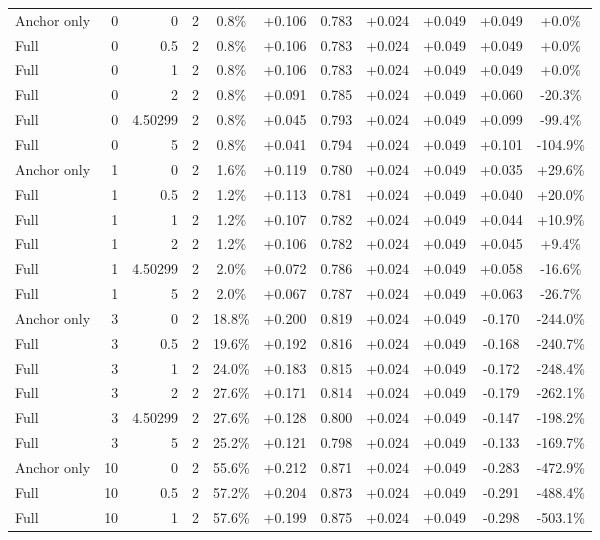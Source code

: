 \begin{table}[htbp]
\begin{tabular}{lrrrccccccc}
Anchor only & 0 & 0 & 2 & 0.8\% & +0.106 & 0.783 & +0.024 & +0.049 & +0.049 & +0.0\% \\
Full & 0 & 0.5 & 2 & 0.8\% & +0.106 & 0.783 & +0.024 & +0.049 & +0.049 & +0.0\% \\
Full & 0 & 1 & 2 & 0.8\% & +0.106 & 0.783 & +0.024 & +0.049 & +0.049 & +0.0\% \\
Full & 0 & 2 & 2 & 0.8\% & +0.091 & 0.785 & +0.024 & +0.049 & +0.060 & -20.3\% \\
Full & 0 & 4.50299 & 2 & 0.8\% & +0.045 & 0.793 & +0.024 & +0.049 & +0.099 & -99.4\% \\
Full & 0 & 5 & 2 & 0.8\% & +0.041 & 0.794 & +0.024 & +0.049 & +0.101 & -104.9\% \\
Anchor only & 1 & 0 & 2 & 1.6\% & +0.119 & 0.780 & +0.024 & +0.049 & +0.035 & +29.6\% \\
Full & 1 & 0.5 & 2 & 1.2\% & +0.113 & 0.781 & +0.024 & +0.049 & +0.040 & +20.0\% \\
Full & 1 & 1 & 2 & 1.2\% & +0.107 & 0.782 & +0.024 & +0.049 & +0.044 & +10.9\% \\
Full & 1 & 2 & 2 & 1.2\% & +0.106 & 0.782 & +0.024 & +0.049 & +0.045 & +9.4\% \\
Full & 1 & 4.50299 & 2 & 2.0\% & +0.072 & 0.786 & +0.024 & +0.049 & +0.058 & -16.6\% \\
Full & 1 & 5 & 2 & 2.0\% & +0.067 & 0.787 & +0.024 & +0.049 & +0.063 & -26.7\% \\
Anchor only & 3 & 0 & 2 & 18.8\% & +0.200 & 0.819 & +0.024 & +0.049 & -0.170 & -244.0\% \\
Full & 3 & 0.5 & 2 & 19.6\% & +0.192 & 0.816 & +0.024 & +0.049 & -0.168 & -240.7\% \\
Full & 3 & 1 & 2 & 24.0\% & +0.183 & 0.815 & +0.024 & +0.049 & -0.172 & -248.4\% \\
Full & 3 & 2 & 2 & 27.6\% & +0.171 & 0.814 & +0.024 & +0.049 & -0.179 & -262.1\% \\
Full & 3 & 4.50299 & 2 & 27.6\% & +0.128 & 0.800 & +0.024 & +0.049 & -0.147 & -198.2\% \\
Full & 3 & 5 & 2 & 25.2\% & +0.121 & 0.798 & +0.024 & +0.049 & -0.133 & -169.7\% \\
Anchor only & 10 & 0 & 2 & 55.6\% & +0.212 & 0.871 & +0.024 & +0.049 & -0.283 & -472.9\% \\
Full & 10 & 0.5 & 2 & 57.2\% & +0.204 & 0.873 & +0.024 & +0.049 & -0.291 & -488.4\% \\
Full & 10 & 1 & 2 & 57.6\% & +0.199 & 0.875 & +0.024 & +0.049 & -0.298 & -503.1\% \\

\end{tabular}
\end{table}
